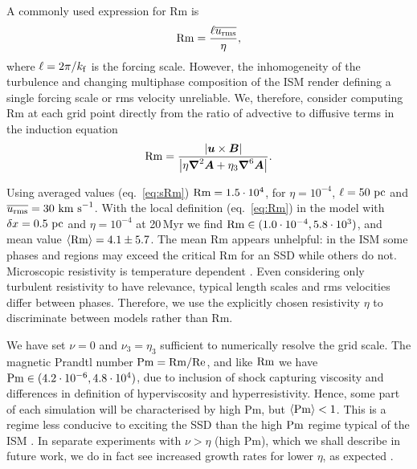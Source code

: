 \documentclass[preprint2]{aastex63}
\newcommand\Rm{{\rm Rm} }
\newcommand\Rey{{\rm Re} }
\newcommand\Pm{{\rm Pm} }
\newcommand\kf{k_{\rm f} }
\newcommand{\vect}[1]{{{\mbox{\boldmath $#1$}}}}%
\newcommand\pc{~ {\rm pc}}
\newcommand\dx{ {\delta x}}
\newcommand\kms{~ {\rm km~ s}^{-1}}
\begin{document}
 A commonly used expression for Rm is 
 \begin{equation}\label{eq:sRm}
 \Rm=\frac{\ell \overline{u_{\rm rms}}}{\eta},
\end{equation}
  where $\ell = 2 \pi/\kf$ is the forcing scale.
 However, the inhomogeneity of the turbulence and changing multiphase
 composition of the ISM render defining a single forcing scale or rms velocity
 unreliable.
 We, therefore, consider computing Rm at each grid point directly from the
 ratio of advective to diffusive terms in the induction equation
 \begin{eqnarray}\label{eq:Rm}
   \Rm = \frac{\left|\vect{u}\times\vect{B}\right|}{
     \left|\eta\vect\nabla^2\vect{A}+\eta_3\vect\nabla^6\vect{A}\right|}.
 \end{eqnarray}

 Using averaged values (eq.~\eqref{eq:sRm}) 
 $\Rm = 1.5 \cdot 10^4$, for $\eta=10^{-4}$, $\ell=50\pc$ and
 $\overline{u_{\rm rms}}=30\kms$.
 With the local definition (eq.~\eqref{eq:Rm}) in the model with 
 $\dx=0.5\pc$ and $\eta=10^{-4}$ at 20\,Myr we find
 $\Rm\in(1.0\cdot10^{-4},5.8\cdot 10^3)$,
 and mean value $\langle\Rm\rangle=4.1\pm5.7$.
 The mean Rm appears unhelpful:
 in the ISM some phases and regions may exceed the critical Rm for an
 SSD while others do not.
 Microscopic resistivity is temperature dependent \citep{CSR50}.
 Even considering only turbulent resistivity to have relevance, 
 typical length scales and rms velocities differ between phases.
 Therefore, we use the explicitly chosen resistivity $\eta$ to discriminate
 between models rather than Rm.

 We have set $\nu=0$ and $\nu_3=\eta_3$ sufficient to numerically resolve the
 grid scale.
 The magnetic Prandtl number $\Pm = \Rm/\Rey$, and like $\Rm$ we have
 $\Pm\in(4.2\cdot10^{-6},4.8\cdot10^{4})$, due 
 to inclusion of shock capturing viscosity and differences in
 definition of hyperviscosity and hyperresistivity.
 Hence, some part of each simulation will be characterised by high Pm,
 but $\langle\Pm\rangle<1$.
 This is a regime less conducive to exciting the SSD than the high $\Pm$ regime
 typical of the ISM \citep{HBD04}.
 In separate experiments with $\nu>\eta$ (high Pm), which we shall describe in
 future work, we do in fact see increased growth rates for lower $\eta$, as
 expected \citep{Sch07}.
\end{document}
